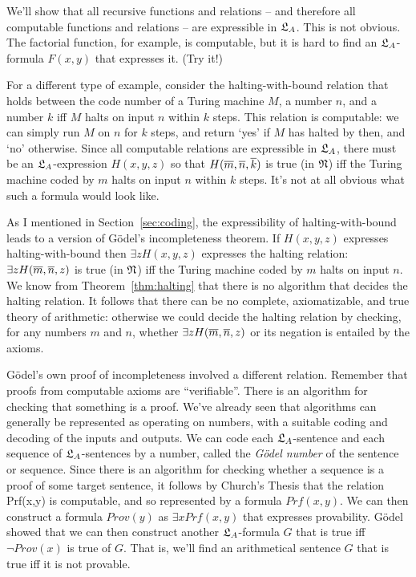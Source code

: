 We'll show that all recursive functions and relations
-- and therefore all computable functions and relations --
are expressible in $\mathfrak{L}_{A}$.
This is not obvious.
The factorial function,
for example, is computable,
but it is hard to find an $\mathfrak{L}_{A}$-formula $F(x,y)$ that expresses it.
(Try it!)

For a different type of example,
consider the halting-with-bound relation that holds between the code number of a Turing machine $M$,
a number $n$,
and a number $k$
iff $M$ halts on input $n$ within $k$ steps.
This relation is computable:
we can simply run $M$ on $n$ for $k$ steps,
and return `yes' if $M$ has halted by then,
and `no' otherwise.
Since all computable relations are expressible in $\mathfrak{L}_{A}$,
there must be an $\mathfrak{L}_A$-expression $H(x,y,z)$ so that
$H(\overline{m},\overline{n},\overline{k})$ is true (in $\mathfrak{N}$) iff
the Turing machine coded by $m$ halts on input $n$ within $k$ steps.
It's not at all obvious what such a formula would look like.

As I mentioned in Section~\ref{sec:coding},
the expressibility of halting-with-bound leads to a version of Gödel's incompleteness theorem.
If $H(x,y,z)$ expresses halting-with-bound then 
$\exists z H(x,y,z)$ expresses the halting relation:
$\exists z H(\overline{m},\overline{n},z)$ is true (in $\mathfrak{N}$) iff
the Turing machine coded by $m$ halts on input $n$.
We know from Theorem~\ref{thm:halting} that
there is no algorithm that decides the halting relation.
It follows that
there can be no complete, axiomatizable, and true theory of arithmetic:
otherwise we could decide the halting relation by checking,
for any numbers $m$ and $n$,
whether $\exists z H(\overline{m},\overline{n},z)$ or its negation
is entailed by the axioms.

\iffalse

Gödel's own proof of incompleteness involved a different relation.
Remember that proofs from computable axioms are ``verifiable''.
There is an algorithm for checking that something is a proof.
We've already seen that
algorithms can generally be represented as operating on numbers,
with a suitable coding and decoding of the inputs and outputs.
We can code each $\mathfrak{L}_{A}$-sentence and each sequence of $\mathfrak{L}_{A}$-sentences by a number,
called the \emph{Gödel number} of the sentence or sequence.
Since there is an algorithm
for checking whether a sequence is a proof of some target sentence,
it follows by Church's Thesis that
the relation Prf(x,y) is computable,
and so represented by a formula $Prf(x,y)$.
We can then construct a formula $Prov(y)$ as $\exists x Prf(x,y)$
that expresses provability.
Gödel showed that
we can then construct another $\mathfrak{L}_{A}$-formula $G$ that is true iff
$\neg Prov(x)$ is true of $G$.
That is,
we'll find an arithmetical sentence $G$ that is true iff it is not provable.

